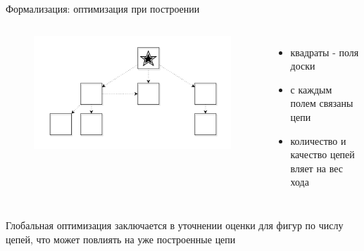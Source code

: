 \begin{frame}{Формализация: оптимизация при построении}
\begin{columns}
\begin{figure}
\includegraphics[scale=0.2]{./pictures/piece.png}
\end{figure}
\begin{itemize}
\item квадраты - поля доски
\item с каждым полем связаны цепи
\item количество и качество цепей вляет на вес хода
\end{itemize}
\end{columns}
Глобальная оптимизация заключается в уточнении оценки для фигур по числу цепей, что может повлиять на уже построенные цепи
\end{frame}
